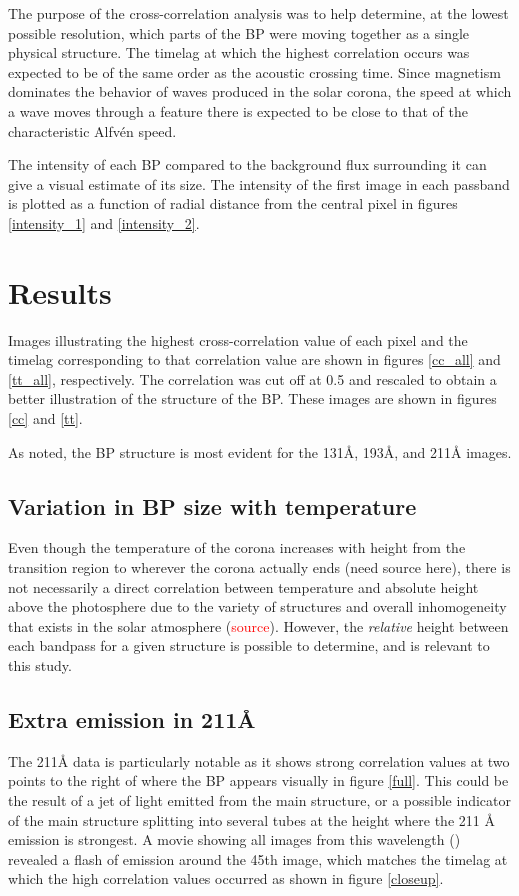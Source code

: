 \documentclass[preprint2]{aastex}
\begin{document}
The purpose of the cross-correlation analysis was to help
determine, at the lowest possible resolution, which parts of the BP were moving
together as a single physical structure. The timelag at which the highest correlation
occurs was expected to be of the same order as the acoustic crossing time.
Since
magnetism dominates the behavior of waves produced in the solar corona, the
speed at which a wave moves through a feature there is expected
to be close to that of the characteristic Alfv\'en speed.



The intensity of each BP compared to the background flux surrounding it
can give a visual estimate
of its size. The intensity of the first image in each
passband is plotted as a function of radial distance from the central pixel in figures
\ref{intensity_1} and \ref{intensity_2}.





\section{Results}\label{results}

Images illustrating the highest cross-correlation value of each pixel and the
timelag corresponding to that correlation value are shown in figures \ref{cc_all}
and \ref{tt_all}, respectively. The correlation was cut off at 0.5 and rescaled to obtain a
better illustration of the structure of the BP. These images are shown in
figures \ref{cc} and \ref{tt}.

As \cite{Alipour} noted, the BP structure is most evident for the
131\AA{}, 193\AA{}, and 211\AA{} images.

\subsection{Variation in BP size with temperature}
Even though the temperature of the corona increases with height from the transition
region to wherever the corona actually ends (need source here), there is not necessarily
a direct correlation between temperature and absolute height above the photosphere
due to the variety of structures
and overall inhomogeneity that exists in the solar atmosphere (\textcolor{red}{source}).
However, the \emph{relative} height between each bandpass for a given structure is
possible to determine, and is relevant to this study.

\subsection{Extra emission in 211\AA{}}
The 211\AA{} data is particularly notable as it shows strong correlation values
at two points to the right of where the BP appears visually in figure \ref{full}.
This could be the result of a jet of light emitted from the main structure, or a
possible indicator of the main structure splitting into several tubes at the
height where the 211 \AA{} emission is strongest.
A movie showing all images from this wavelength (\cite{ssw}) revealed a flash
of emission around the 45th image,
which matches the timelag at which the high correlation values occurred as shown
in figure \ref{closeup}.
\end{document}

